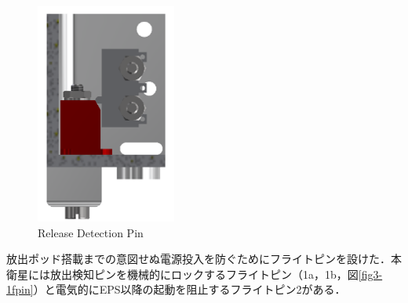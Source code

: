 \begin{figure}[htbp]
	\begin{minipage}{0.32\hsize}
		\centering
		\includegraphics[height=0.7\linewidth]{./03/fig/pin_c.png}
	\end{minipage}
	\caption{Release Detection Pin}
	\label{fig3-1pin}
\end{figure}


放出ポッド搭載までの意図せぬ電源投入を防ぐためにフライトピンを設けた．本衛星には放出検知ピンを機械的にロックするフライトピン（1a，1b，図\ref{fig3-1fpin}）と電気的にEPS以降の起動を阻止するフライトピン2がある．

